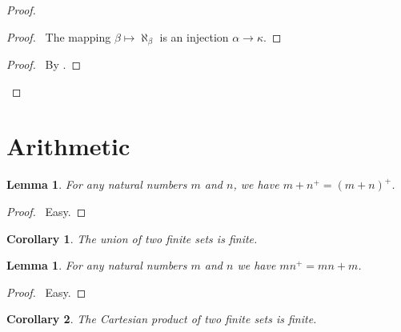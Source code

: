 \documentclass{report}
\let\qed\relax
\newtheorem{lemma}[axiom]{Lemma}
\newtheorem{corollary}{Corollary}[axiom]
\theoremstyle{definition}
\begin{document}
    \begin{proof}
        \pf
        \begin{proof}
            \pf\ The mapping $\beta \mapsto \aleph_\beta$ is an injection $\alpha \rightarrow \kappa$.
        \end{proof}
        \begin{proof}
            \pf\ By .
        \end{proof}
        \qed
    \end{proof}

    \section{Arithmetic}

    \begin{lemma}
        For any natural numbers $m$ and $n$, we have $m + n^+ = (m+n)^+$.
    \end{lemma}

    \begin{proof}
        \pf\ Easy. \qed
    \end{proof}

    \begin{corollary}
        The union of two finite sets is finite.
    \end{corollary}

    \begin{lemma}
        For any natural numbers $m$ and $n$ we have $m n^+ = mn + m$.
    \end{lemma}

    \begin{proof}
        \pf\ Easy. \qed
    \end{proof}

    \begin{corollary}
        The Cartesian product of two finite sets is finite.
    \end{corollary}
\end{document}
